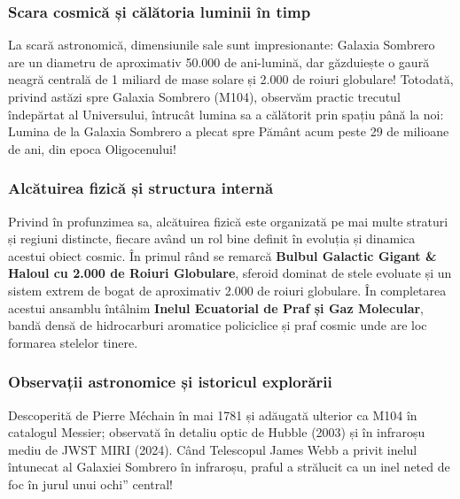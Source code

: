 \subsubsection*{Scara cosmică și călătoria luminii în timp}
La scară astronomică, dimensiunile sale sunt impresionante: Galaxia Sombrero are un diametru de aproximativ 50.000 de ani-lumină, dar găzduiește o gaură neagră centrală de 1 miliard de mase solare și 2.000 de roiuri globulare! Totodată, privind astăzi spre Galaxia Sombrero (M104), observăm practic trecutul îndepărtat al Universului, întrucât lumina sa a călătorit prin spațiu până la noi: Lumina de la Galaxia Sombrero a plecat spre Pământ acum peste 29 de milioane de ani, din epoca Oligocenului!

\subsubsection*{Alcătuirea fizică și structura internă}
Privind în profunzimea sa, alcătuirea fizică este organizată pe mai multe straturi și regiuni distincte, fiecare având un rol bine definit în evoluția și dinamica acestui obiect cosmic. În primul rând se remarcă \textbf{Bulbul Galactic Gigant \& Haloul cu 2.000 de Roiuri Globulare}, sferoid dominat de stele evoluate și un sistem extrem de bogat de aproximativ 2.000 de roiuri globulare. În completarea acestui ansamblu întâlnim \textbf{Inelul Ecuatorial de Praf și Gaz Molecular}, bandă densă de hidrocarburi aromatice policiclice și praf cosmic unde are loc formarea stelelor tinere.

\subsubsection*{Observații astronomice și istoricul explorării}
Descoperită de Pierre Méchain în mai 1781 și adăugată ulterior ca M104 în catalogul Messier; observată în detaliu optic de Hubble (2003) și în infraroșu mediu de JWST MIRI (2024). Când Telescopul James Webb a privit inelul întunecat al Galaxiei Sombrero în infraroșu, praful a strălucit ca un inel neted de foc în jurul unui \quotedblbase{}ochi\textquotedblright{} central!

